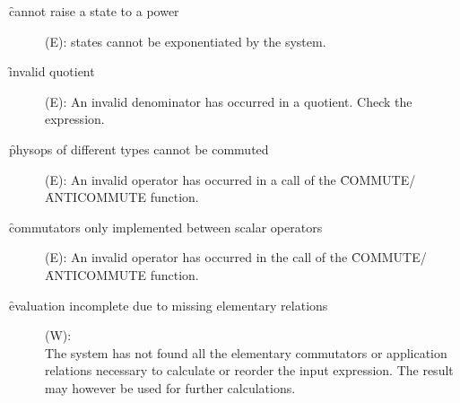 \begin{description}
\item[\f{cannot raise a state to a power}] (E): states cannot be
exponentiated by the system.

\item[\f{invalid quotient}] (E): An invalid denominator has occurred in a
quotient. Check the expression.

\item[\f{physops of different types cannot be commuted}] (E): An invalid
operator has occurred in a call of the \f{COMMUTE}/\f{ANTICOMMUTE} function.

\item[\f{commutators only implemented between scalar operators}] (E):
An invalid operator has occurred in the call of the
\f{COMMUTE}/\f{ANTICOMMUTE} function.

\item[\f{evaluation incomplete due to missing elementary relations}] (W):
\\
The system has not found all
the elementary commutators or application relations necessary to
calculate or reorder the input expression. The result may however be
used for further calculations.
\end{description}
